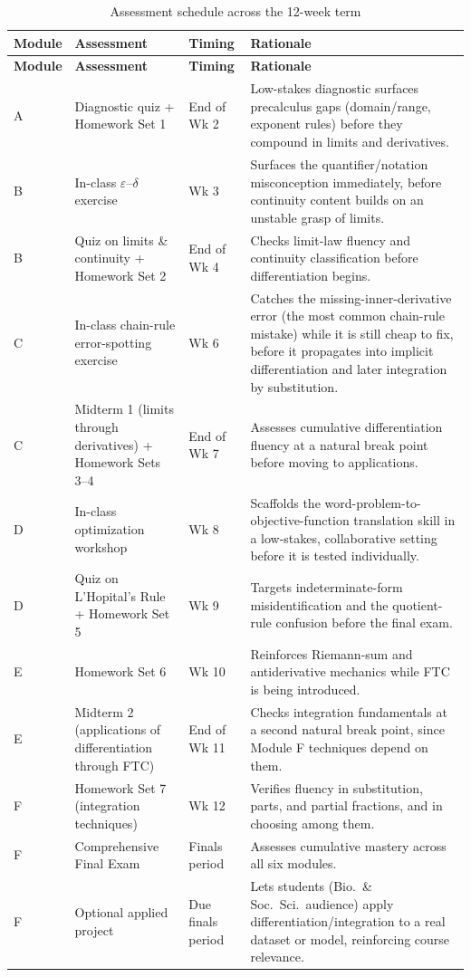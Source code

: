 \documentclass[11pt]{article}
\begin{document}
\begin{longtable}{p{2.6cm}p{3.6cm}p{2.0cm}p{6.0cm}}
\caption{Assessment schedule across the 12-week term} \\
\toprule
\textbf{Module} & \textbf{Assessment} & \textbf{Timing} & \textbf{Rationale} \\
\midrule
\endfirsthead
\toprule
\textbf{Module} & \textbf{Assessment} & \textbf{Timing} & \textbf{Rationale} \\
\midrule
\endhead
\bottomrule
\endfoot
A & Diagnostic quiz + Homework Set 1 & End of Wk 2 & Low-stakes diagnostic surfaces precalculus gaps (domain/range, exponent rules) before they compound in limits and derivatives. \\
B & In-class $\varepsilon$--$\delta$ exercise & Wk 3 & Surfaces the quantifier/notation misconception immediately, before continuity content builds on an unstable grasp of limits. \\
B & Quiz on limits \& continuity + Homework Set 2 & End of Wk 4 & Checks limit-law fluency and continuity classification before differentiation begins. \\
C & In-class chain-rule error-spotting exercise & Wk 6 & Catches the missing-inner-derivative error (the most common chain-rule mistake) while it is still cheap to fix, before it propagates into implicit differentiation and later integration by substitution. \\
C & Midterm 1 (limits through derivatives) + Homework Sets 3--4 & End of Wk 7 & Assesses cumulative differentiation fluency at a natural break point before moving to applications. \\
D & In-class optimization workshop & Wk 8 & Scaffolds the word-problem-to-objective-function translation skill in a low-stakes, collaborative setting before it is tested individually. \\
D & Quiz on L'Hopital's Rule + Homework Set 5 & Wk 9 & Targets indeterminate-form misidentification and the quotient-rule confusion before the final exam. \\
E & Homework Set 6 & Wk 10 & Reinforces Riemann-sum and antiderivative mechanics while FTC is being introduced. \\
E & Midterm 2 (applications of differentiation through FTC) & End of Wk 11 & Checks integration fundamentals at a second natural break point, since Module F techniques depend on them. \\
F & Homework Set 7 (integration techniques) & Wk 12 & Verifies fluency in substitution, parts, and partial fractions, and in choosing among them. \\
F & Comprehensive Final Exam & Finals period & Assesses cumulative mastery across all six modules. \\
F & Optional applied project & Due finals period & Lets students (Bio.\ \& Soc.\ Sci.\ audience) apply differentiation/integration to a real dataset or model, reinforcing course relevance. \\
\end{longtable}
\end{document}
